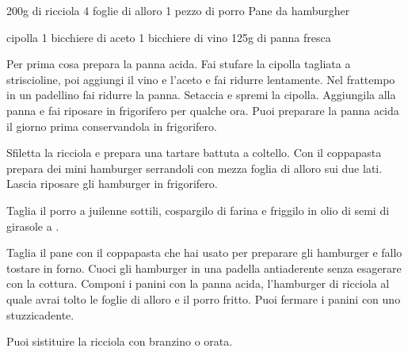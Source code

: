 \begin{ingreds}
	200g di ricciola
	4 foglie di alloro
	1 pezzo di porro
	Pane da hamburgher
	
\columnbreak
{} cipolla
	1 bicchiere di aceto
	1 bicchiere di vino
	125g di panna fresca
\end{ingreds}

\begin{method}
Per prima cosa prepara la panna acida. Fai stufare la cipolla tagliata a striscioline, poi aggiungi il vino e l'aceto e fai ridurre lentamente. Nel frattempo in un padellino fai ridurre la panna. Setaccia e spremi la cipolla. Aggiungila alla panna e fai riposare in frigorifero per qualche ora. Puoi preparare la panna acida il giorno prima conservandola in frigorifero.

Sfiletta la ricciola e prepara una tartare battuta a coltello. Con il coppapasta prepara dei mini hamburger serrandoli con mezza foglia di alloro sui due lati. Lascia riposare gli hamburger in frigorifero.

Taglia il porro a juilenne sottili, cospargilo di farina e friggilo in olio di semi di girasole a .

Taglia il pane con il coppapasta che hai usato per preparare gli hamburger e fallo tostare in forno. Cuoci gli hamburger in una padella antiaderente senza esagerare con la cottura. Componi i panini con la panna acida, l'hamburger di ricciola al quale avrai tolto le foglie di alloro e il porro fritto. Puoi fermare i panini con uno stuzzicadente.
\end {method}
	\begin{note}
		Puoi sistituire la ricciola con branzino o orata.
	\end{note}
